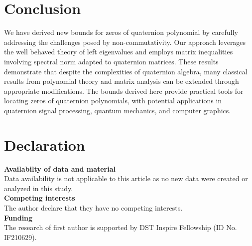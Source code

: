 \documentclass [12pt]{article}
\begin{document}
\section{Conclusion}

We have derived new bounds for zeros of quaternion polynomial by carefully addressing the challenges posed by non-commutativity. Our approach leverages the well behaved theory of left eigenvalues and employs matrix inequalities involving spectral norm adapted to quaternion matrices.
These results demonstrate that despite the complexities of quaternion algebra, many classical results from polynomial theory and matrix analysis can be extended through appropriate modifications. The bounds derived here provide practical tools for locating zeros of quaternion polynomials, with potential applications in quaternion signal processing, quantum mechanics, and computer graphics.

\section{Declaration}
\textbf{Availabilty of data and material}\\
 Data availability is not applicable to this article as no new data were created or analyzed in this study.\\

\noindent \textbf{Competing interests}\\
The author declare that they have no competing interests.\\

\noindent \textbf{Funding}\\
The research of first author is supported by DST Inspire Fellowship (ID No. IF210629).
\end{document}
